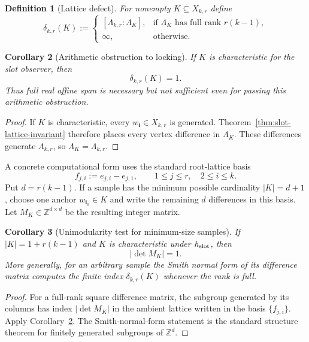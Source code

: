 \documentclass[11pt]{article}
\newtheorem{definition}{Definition}[section]
\newtheorem{corollary}[definition]{Corollary}
\begin{document}
\begin{definition}[Lattice defect]
For nonempty $K\subseteq X_{k,r}$ define
\[
 \delta_{k,r}(K)
 :=
 \begin{cases}
  [\Lambda_{k,r}:\Lambda_K],
    &\text{if }\Lambda_K\text{ has full rank }r(k-1),\\
  \infty,&\text{otherwise.}
 \end{cases}
\]
\end{definition}

\begin{corollary}[Arithmetic obstruction to locking]
\label{cor:lattice-defect}
If $K$ is characteristic for the slot observer, then
\[
 \boxed{\delta_{k,r}(K)=1.}
\]
Thus full real affine span is necessary but not sufficient even for passing
this arithmetic obstruction.
\end{corollary}

\begin{proof}
If $K$ is characteristic, every $w_{\mathbf i}\in X_{k,r}$ is generated.
Theorem~\ref{thm:slot-lattice-invariant} therefore places every vertex
difference in $\Lambda_K$.  These differences generate
$\Lambda_{k,r}$, so $\Lambda_K=\Lambda_{k,r}$.
\end{proof}

A concrete computational form uses the standard root-lattice basis
\[
 f_{j,i}:=e_{j,i}-e_{j,1},
 \qquad 1\le j\le r,\quad 2\le i\le k.
\]
Put $d=r(k-1)$.  If a sample has the minimum possible cardinality
$|K|=d+1$, choose one anchor $w_{\mathbf i_0}\in K$ and write the remaining
$d$ differences in this basis.  Let $M_K\in\mathbb Z^{d\times d}$ be the
resulting integer matrix.

\begin{corollary}[Unimodularity test for minimum-size samples]
\label{cor:unimodular-test}
If $|K|=1+r(k-1)$ and $K$ is characteristic under $h_{\rm slot}$, then
\[
 \boxed{|\det M_K|=1.}
\]
More generally, for an arbitrary sample the Smith normal form of its difference
matrix computes the finite index $\delta_{k,r}(K)$ whenever the rank is full.
\end{corollary}

\begin{proof}
For a full-rank square difference matrix, the subgroup generated by its columns
has index $|\det M_K|$ in the ambient lattice written in the basis
$\{f_{j,i}\}$.  Apply Corollary~\ref{cor:lattice-defect}.  The Smith-normal-form
statement is the standard structure theorem for finitely generated subgroups
of $\mathbb Z^d$.
\end{proof}
\end{document}
